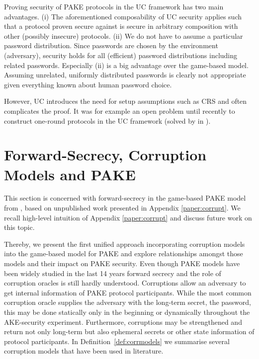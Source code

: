 Proving security of \ac{PAKE} protocols in the \ac{UC} framework has two main advantages.
(i) The aforementioned composability of \ac{UC} security applies such that a protocol proven secure against \cFPAKE is secure in arbitrary composition with other (possibly insecure) protocols.
(ii) We do not have to assume a particular password distribution.
Since passwords are chosen by the environment (adversary), security holds for all (efficient) password distributions including related passwords.
Especially (ii) is a big advantage over the game-based model.
Assuming unrelated, uniformly distributed passwords is clearly not appropriate given everything known about human password choice.

However, \ac{UC} introduces the need for setup assumptions such as \ac{CRS} and often complicates the proof.
It was for example an open problem until recently to construct one-round protocols in the \ac{UC} framework (solved by \citeauthor{Benhamouda2013} \cite{Benhamouda2013} in \citeyear{Benhamouda2013}).

\section{Forward-Secrecy, Corruption Models and PAKE} \label{sec:corrupt}
This section is concerned with forward-secrecy in the game-based \ac{PAKE} model from \cite{Bellare2000,Abdalla2005}, based on unpublished work presented in Appendix \ref{paper:corrupt}.
We recall high-level intuition of Appendix \ref{paper:corrupt} and discuss future work on this topic.

Thereby, we present the first unified approach incorporating corruption models into the game-based model for \ac{PAKE} and explore relationships amongst those models and their impact on \ac{PAKE} security.
Even though \ac{PAKE} models have been widely studied in the last 14 years forward secrecy and the role of corruption oracles is still hardly understood.
Corruptions allow an adversary to get internal information of \ac{PAKE} protocol participants.
While the most common corruption oracle supplies the adversary with the long-term secret, the password, this may be done statically only in the beginning or dynamically throughout the \ac{AKE}-security experiment.
Furthermore, corruptions may be strengthened and return not only long-term but also ephemeral secrets or other state information of protocol participants.
In Definition~\ref{def:corrmodels} we summarise several corruption models that have been used in literature.

